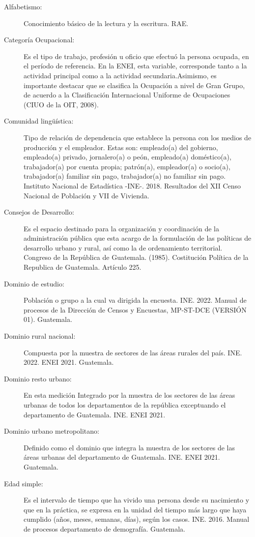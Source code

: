 \begin{description}
	\item[Alfabetismo:] Conocimiento básico de la lectura y la escritura. RAE.
	\item[Categoría Ocupacional:] Es el tipo de trabajo, profesión u oficio que efectuó la persona ocupada, en el período de referencia. En la ENEI, esta variable, corresponde tanto a la actividad principal como a la actividad secundaria.Asimismo, es importante destacar que se clasifica la Ocupación a nivel de Gran Grupo, de acuerdo a la Clasificación Internacional Uniforme de Ocupaciones (CIUO de la OIT, 2008).
	\item[Comunidad lingüística:] Tipo de relación de dependencia que establece la persona con los medios de producción y el empleador. Estas son: empleado(a) del gobierno, empleado(a) privado, jornalero(a) o peón, empleado(a) doméstico(a), trabajador(a) por cuenta propia; patrón(a), empleador(a) o socio(a), trabajador(a) familiar sin pago, trabajador(a) no familiar sin pago. Instituto Nacional de Estadística -INE-. 2018. Resultados del XII Censo Nacional de Población y VII de Vivienda.
	\item[Consejos de Desarrollo:] Es el espacio destinado para la organización y coordinación de la administración pública que esta acargo de la formulación de las políticas de desarrollo urbano y rural, así como la de ordenamiento territorial. Congreso de la República de Guatemala. (1985). Costitución Política de la Republica de Guatemala. Artículo 225.
	\item[Dominio de estudio:] Población o grupo a la cual va dirigida la encuesta. INE. 2022. Manual de procesos de la Dirección de Censos y Encuestas, MP-ST-DCE (VERSIÓN 01). Guatemala.
	\item[Dominio rural nacional:] Compuesta por la muestra de sectores de las áreas rurales del país. INE. 2022. ENEI 2021. Guatemala.
	\item[Dominio resto urbano:] En esta medición Integrado por la muestra de los sectores de las áreas urbanas de todos los departamentos de la república exceptuando el departamento de Guatemala. INE. ENEI 2021.
	\item[Dominio urbano metropolitano:] Definido como el dominio que integra la muestra de los sectores de las áreas urbanas del departamento de Guatemala. INE. ENEI 2021. Guatemala.
	\item[Edad simple:] Es el intervalo de tiempo que ha vivido una persona desde su nacimiento y que en la práctica, se expresa en la unidad del tiempo más largo que haya cumplido (años, meses, semanas, días), según los casos. INE. 2016. Manual de procesos departamento de demografía. Guatemala.

\end{description}
